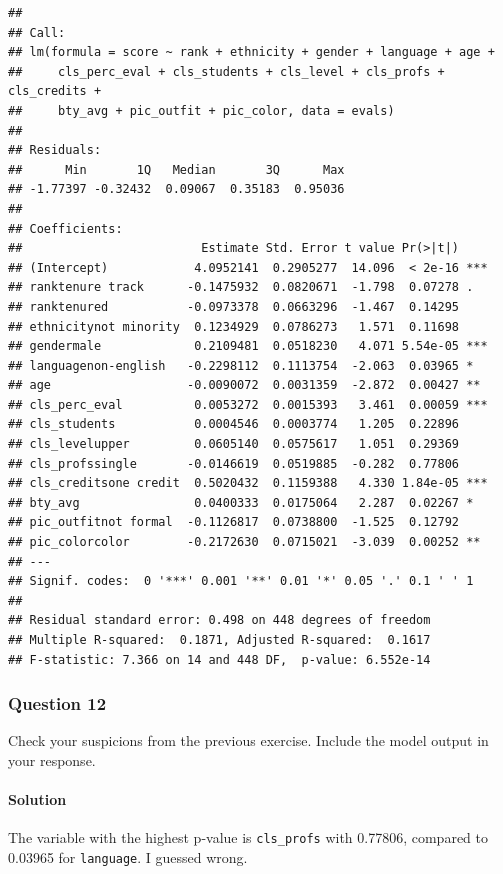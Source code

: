 \documentclass[]{article}
\let\oldparagraph\paragraph
\renewcommand{\paragraph}[1]{\oldparagraph{#1}\mbox{}}
\begin{document}
\begin{verbatim}
## 
## Call:
## lm(formula = score ~ rank + ethnicity + gender + language + age + 
##     cls_perc_eval + cls_students + cls_level + cls_profs + cls_credits + 
##     bty_avg + pic_outfit + pic_color, data = evals)
## 
## Residuals:
##      Min       1Q   Median       3Q      Max 
## -1.77397 -0.32432  0.09067  0.35183  0.95036 
## 
## Coefficients:
##                         Estimate Std. Error t value Pr(>|t|)    
## (Intercept)            4.0952141  0.2905277  14.096  < 2e-16 ***
## ranktenure track      -0.1475932  0.0820671  -1.798  0.07278 .  
## ranktenured           -0.0973378  0.0663296  -1.467  0.14295    
## ethnicitynot minority  0.1234929  0.0786273   1.571  0.11698    
## gendermale             0.2109481  0.0518230   4.071 5.54e-05 ***
## languagenon-english   -0.2298112  0.1113754  -2.063  0.03965 *  
## age                   -0.0090072  0.0031359  -2.872  0.00427 ** 
## cls_perc_eval          0.0053272  0.0015393   3.461  0.00059 ***
## cls_students           0.0004546  0.0003774   1.205  0.22896    
## cls_levelupper         0.0605140  0.0575617   1.051  0.29369    
## cls_profssingle       -0.0146619  0.0519885  -0.282  0.77806    
## cls_creditsone credit  0.5020432  0.1159388   4.330 1.84e-05 ***
## bty_avg                0.0400333  0.0175064   2.287  0.02267 *  
## pic_outfitnot formal  -0.1126817  0.0738800  -1.525  0.12792    
## pic_colorcolor        -0.2172630  0.0715021  -3.039  0.00252 ** 
## ---
## Signif. codes:  0 '***' 0.001 '**' 0.01 '*' 0.05 '.' 0.1 ' ' 1
## 
## Residual standard error: 0.498 on 448 degrees of freedom
## Multiple R-squared:  0.1871, Adjusted R-squared:  0.1617 
## F-statistic: 7.366 on 14 and 448 DF,  p-value: 6.552e-14
\end{verbatim}

\subsubsection{Question 12}\label{question-12}

Check your suspicions from the previous exercise. Include the model
output in your response.

\paragraph{Solution}\label{solution-11}

The variable with the highest p-value is \texttt{cls\_profs} with
0.77806, compared to 0.03965 for \texttt{language}. I guessed wrong.
\end{document}
